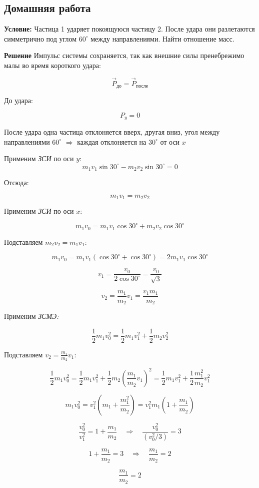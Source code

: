 \documentclass[a4paper,12pt]{article}
\begin{document}
\begin{center}
\subsection*{Домашняя работа }
\end{center}

\textbf{Условие:} Частица 1 ударяет покоящуюся частицу 2. После удара они разлетаются симметрично под углом $60^\circ$ между направлениями. Найти отношение масс.

\bigskip

\textbf{Решение}
Импульс системы сохраняется, так как внешние силы пренебрежимо малы во время короткого удара:

\[
\vec P_\text{до} = \vec P_\text{после}
\]

До удара:

\[
P_y = 0
\]

После удара одна частица отклоняется вверх, другая вниз, угол между направлениями $60^\circ$ $\Rightarrow$ каждая отклоняется на $30^\circ$ от оси $x$  

\vspace{2em}
Применим \textit{ЗСИ} по оси $y$:
\[
m_1 v_1 \sin 30^\circ - m_2 v_2 \sin 30^\circ = 0
\]

Отсюда:

\[
m_1 v_1 = m_2 v_2
\]

Применим \textit{ЗСИ} по оси $x$:

\[
m_1 v_0 = m_1 v_1 \cos 30^\circ + m_2 v_2 \cos 30^\circ
\]

Подставляем $m_2 v_2 = m_1 v_1$:

\[
m_1 v_0 = m_1 v_1 (\cos 30^\circ + \cos 30^\circ) = 2 m_1 v_1 \cos 30^\circ
\]

\[
v_1 = \frac{v_0}{2 \cos 30^\circ} = \frac{v_0}{\sqrt{3}}
\]

\[
v_2 = \frac{m_1}{m_2} v_1 = \frac{v_1 m_1}{m_2}
\]

Применим \textit{ЗСМЭ:}

\[
\frac{1}{2} m_1 v_0^2 = \frac{1}{2} m_1 v_1^2 + \frac{1}{2} m_2 v_2^2
\]

Подставляем $v_2 = \frac{m_1}{m_2} v_1$:

\[
\frac{1}{2} m_1 v_0^2 = \frac{1}{2} m_1 v_1^2 + \frac{1}{2} m_2 \left(\frac{m_1}{m_2} v_1\right)^2 = \frac{1}{2} m_1 v_1^2 + \frac{1}{2} \frac{m_1^2}{m_2} v_1^2
\]

\[
m_1 v_0^2 = v_1^2 \left( m_1 + \frac{m_1^2}{m_2} \right) = v_1^2 m_1 \left( 1 + \frac{m_1}{m_2} \right)
\]

\[
\frac{v_0^2}{v_1^2} = 1 + \frac{m_1}{m_2} \quad \Rightarrow \quad \frac{v_0^2}{(v_0^2/3)} = 3
\]

\[
1 + \frac{m_1}{m_2} = 3 \quad \Rightarrow \quad \frac{m_1}{m_2} = 2
\]

\[
\boxed{\frac{m_1}{m_2} = 2}
\]
\end{document}
